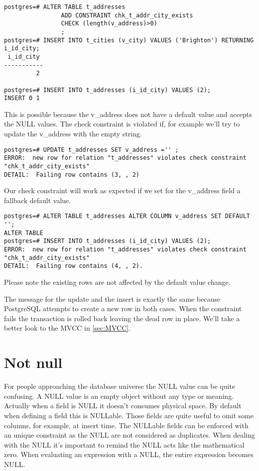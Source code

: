 \begin{lstlisting}[style=pgsql]
postgres=# ALTER TABLE t_addresses
                ADD CONSTRAINT chk_t_addr_city_exists
                CHECK (length(v_address)>0)
                ; 
postgres=# INSERT INTO t_cities (v_city) VALUES ('Brighton') RETURNING i_id_city;
 i_id_city 
-----------
         2

postgres=# INSERT INTO t_addresses (i_id_city) VALUES (2);
INSERT 0 1
\end{lstlisting}


This is possible because the v\_address does not have a default value and accepts the NULL 
values. The check constraint is violated if, for example we'll try to update the v\_address with 
the empty string.

\begin{lstlisting}[style=pgsql]
postgres=# UPDATE t_addresses SET v_address ='' ;
ERROR:  new row for relation "t_addresses" violates check constraint "chk_t_addr_city_exists"
DETAIL:  Failing row contains (3, , 2)
\end{lstlisting}

Our check constraint will work as expected if we set for the v\_address field a fallback default 
value.

\begin{lstlisting}[style=pgsql]
postgres=# ALTER TABLE t_addresses ALTER COLUMN v_address SET DEFAULT '';
ALTER TABLE
postgres=# INSERT INTO t_addresses (i_id_city) VALUES (2);
ERROR:  new row for relation "t_addresses" violates check constraint "chk_t_addr_city_exists"
DETAIL:  Failing row contains (4, , 2).

\end{lstlisting}
Please note the existing rows are not affected by the default value change.

The message for the update and the insert is exactly the same because PostgreSQL attempts to create 
a new row in both cases. When the constraint fails the transaction is rolled back leaving the dead 
row in place. We'll take a better look to the MVCC in \ref{sec:MVCC}.


\section{Not null}
For people approaching the database universe the NULL value can be quite confusing. A NULL value is 
an empty object without any type or meaning. Actually when a field is NULL it doesn't consumes 
physical space. By default when defining a field this is NULLable. Those fields are quite useful to 
omit some columns, for example, at insert time.\newline
The NULLable fields can be enforced with an unique constraint as the NULL are not considered as 
duplicates. When dealing with the NULL it's important to remind the NULL acts like the mathematical 
zero. When evaluating an expression with a NULL, the entire expression becomes NULL.\newline


